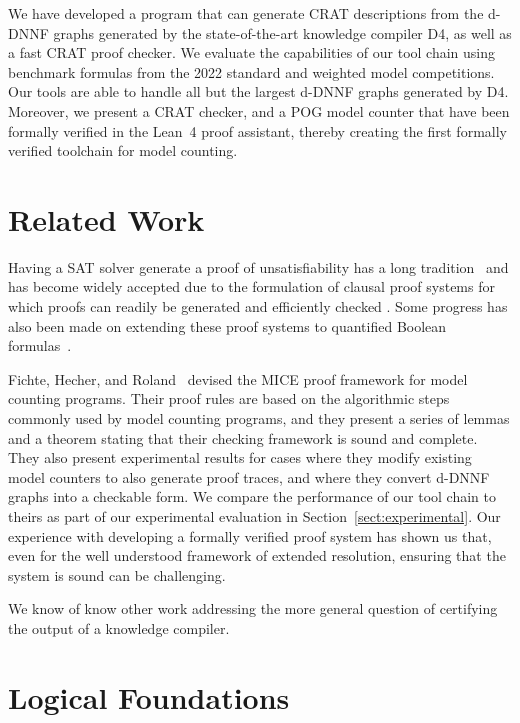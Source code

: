 \documentclass[letterpaper,USenglish,cleveref, autoref, thm-restate]{lipics-v2021}
\newcommand{\progname}[1]{\textsc{#1}}
\newcommand{\dfour}{\progname{D4}}
\newcommand{\lean}{Lean~4}
\begin{document}
We have developed a program that can generate CRAT descriptions from
the d-DNNF graphs generated by the state-of-the-art knowledge compiler
\dfour, as well as a fast CRAT proof checker.  We evaluate the
capabilities of our tool chain using benchmark formulas from the 2022
standard and weighted model competitions.  Our tools are able to
handle all but the largest d-DNNF graphs generated by \dfour.
Moreover, we
present a CRAT checker, and a POG model counter that have been formally verified
in the \lean{} proof assistant, thereby creating the
first formally verified toolchain for
model counting.

\section{Related Work}

Having a SAT solver generate a proof of unsatisfiability has a long
tradition~\cite{ZhangMalik} and has become widely accepted due to the
formulation of clausal proof systems for which proofs can readily be
generated and efficiently checked
\cite{cruz-cade-2017,RAT,wetzler14_drattrim}.  Some progress has also
been made on extending these proof systems to quantified Boolean
formulas~\cite{bryant:cade:2021,heule:JAR2014}.

Fichte, Hecher, and Roland~\cite{fichte:sat:2022} devised the MICE
proof framework for model counting programs.  Their proof rules are
based on the algorithmic steps commonly used by model counting
programs, and they present a series of lemmas and a theorem stating
that their checking framework is sound and complete.  They also
present experimental results for cases where they modify existing
model counters to also generate proof traces, and where they convert
d-DNNF graphs into a checkable form.  We compare the performance of
our tool chain to theirs as part of our experimental evaluation in
Section~\ref{sect:experimental}.  Our experience with developing a
formally verified proof system has shown us that, even for the well
understood framework of extended resolution, ensuring that the system
is sound can be challenging.

We know of know other work addressing the more general question of
certifying the output of a knowledge compiler.


\section{Logical Foundations}
\end{document}
